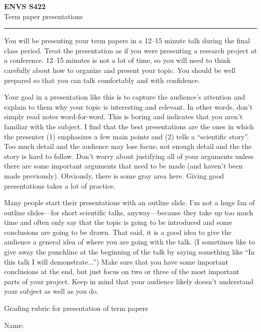\documentclass[11pt,letterpaper]{article}
\begin{document}
\setlength{\parindent}{0in}
\newcommand{\tablespace}[0]{\vspace{8pt}}


\textbf{ENVS S422}\\
Term paper presentations\\

\hrule
You will be presenting your term papers in a 12--15 minute talk during the final class period. Treat the presentation as if you were presenting a research project at a conference. 12--15 minutes is not a lot of time, so you will need to think carefully about how to organize and present your topic. You should be well prepared so that you can talk comfortably and with confidence.

Your goal in a presentation like this is to capture the audience's attention and explain to them why your topic is interesting and relevant. In other words, don't simply read notes word-for-word. This is boring and indicates that you aren't familiar with the subject. I find that the best presentations are the ones in which the presenter (1) emphasizes a few main points and (2) tells a ``scientific story''. Too much detail and the audience may lose focus; not enough detail and the the story is hard to follow. Don't worry about justifying all of your arguments unless there are some important arguments that need to be made (and haven't been made previously). Obviously, there is some gray area here. Giving good presentations takes a lot of practice.

Many people start their presentations with an outline slide. I'm not a huge fan of outline slides---for short scientific talks, anyway---because they take up too much time and often only say that the topic is going to be introduced and some conclusions are going to be drawn. That said, it is a good idea to give the audience a general idea of where you are going with the talk. (I sometimes like to give away the punchline at the beginning of the talk by saying something like ``In this talk I will demonstrate...'') Make sure that you have some important conclusions at the end, but just focus on two or three of the most important parts of your project. Keep in mind that your audience likely doesn't understand your subject as well as you do.

\clearpage
Grading rubric for presentation of term papers

Name:
\vspace{1cm}
\end{document}
